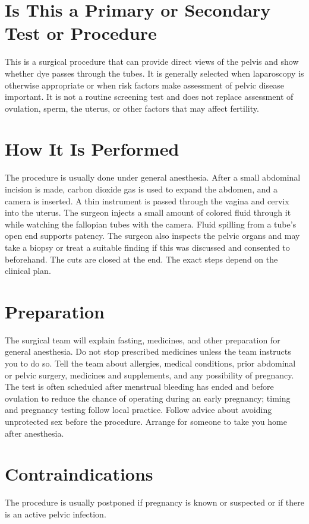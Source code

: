 \section*{Is This a Primary or Secondary Test or Procedure}
This is a surgical procedure that can provide direct views of the pelvis and show whether dye passes through the tubes. It is generally selected when laparoscopy is otherwise appropriate or when risk factors make assessment of pelvic disease important. It is not a routine screening test and does not replace assessment of ovulation, sperm, the uterus, or other factors that may affect fertility.

\section*{How It Is Performed}
The procedure is usually done under general anesthesia. After a small abdominal incision is made, carbon dioxide gas is used to expand the abdomen, and a camera is inserted. A thin instrument is passed through the vagina and cervix into the uterus. The surgeon injects a small amount of colored fluid through it while watching the fallopian tubes with the camera. Fluid spilling from a tube's open end supports patency. The surgeon also inspects the pelvic organs and may take a biopsy or treat a suitable finding if this was discussed and consented to beforehand. The cuts are closed at the end. The exact steps depend on the clinical plan.

\section*{Preparation}
The surgical team will explain fasting, medicines, and other preparation for general anesthesia. Do not stop prescribed medicines unless the team instructs you to do so. Tell the team about allergies, medical conditions, prior abdominal or pelvic surgery, medicines and supplements, and any possibility of pregnancy. The test is often scheduled after menstrual bleeding has ended and before ovulation to reduce the chance of operating during an early pregnancy; timing and pregnancy testing follow local practice. Follow advice about avoiding unprotected sex before the procedure. Arrange for someone to take you home after anesthesia.

\section*{Contraindications}
The procedure is usually postponed if pregnancy is known or suspected or if there is an active pelvic infection.


